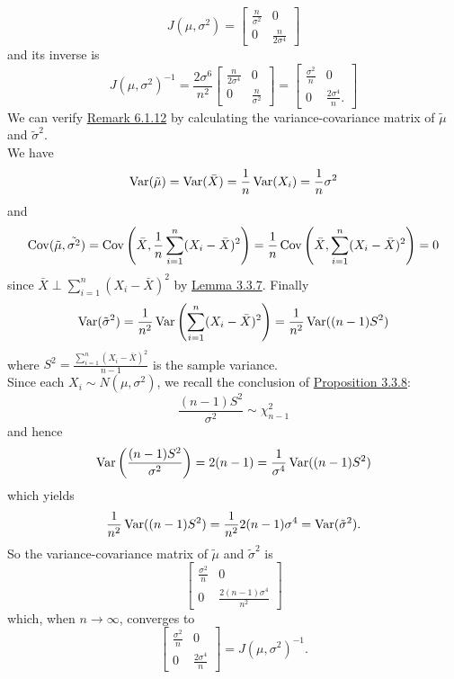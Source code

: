 \documentclass[11pt,fleqn]{book} %
\begin{document}
\begin{example}
\[
J(\mu, \sigma^2) = \begin{bmatrix}
\frac{n}{\sigma^2} & 0 \\
0 & \frac{n}{2\sigma^4}
\end{bmatrix}
\]
and its inverse is
\[
J(\mu, \sigma^2)^{-1} = \frac{2\sigma^6}{n^2}\begin{bmatrix}
\frac{n}{2\sigma^4} & 0 \\
0 & \frac{n}{\sigma^2}
\end{bmatrix} = \begin{bmatrix}
\frac{\sigma^2}{n} & 0 \\
0 & \frac{2\sigma^4}{n}.
\end{bmatrix}
\]
\indent We can verify \hyperref[eg:6112]{Remark 6.1.12} by calculating the variance-covariance matrix of \(\tilde{\mu}\) and \(\tilde{\sigma}^2\). \\
\indent We have
\[
\operatorname{Var}(\tilde{\mu}) = \operatorname{Var}(\bar{X}) = \frac1n\operatorname{Var}(X_i) = \frac1n\sigma^2
\]
and
\[
\operatorname{Cov}(\tilde{\mu}, \tilde{\sigma^2}) = \operatorname{Cov}\left(\bar{X}, \frac1n\sum_{i=1}^n(X_i - \bar{X})^2\right) = \frac1n\operatorname{Cov}\left(\bar{X}, \sum_{i=1}^n(X_i - \bar{X})^2\right) = 0
\]
since \(\bar{X} \perp\sum_{i=1}^n(X_i - \bar{X})^2\) by \hyperref[lemma:337]{Lemma 3.3.7}. Finally
\[
\operatorname{Var}(\tilde{\sigma}^2) = \frac{1}{n^2}\operatorname{Var}\left(\sum_{i=1}^n(X_i - \bar{X})^2\right) = \frac{1}{n^2}\operatorname{Var}((n-1)S^2)
\]
where \(S^2 = \frac{\sum_{i=1}^n(X_i - \bar{X})^2}{n-1}\) is the sample variance. \\
\indent Since each \(X_i \sim N(\mu, \sigma^2)\), we recall the conclusion of \hyperref[prop:338]{Proposition 3.3.8}:
\[
\frac{(n-1)S^2}{\sigma^2} \sim \chi^2_{n-1}
\]
and hence
\[
\operatorname{Var}\left(\frac{(n-1)S^2}{\sigma^2}\right) = 2(n-1) = \frac{1}{\sigma^4}\operatorname{Var}((n-1)S^2)
\]
which yields
\[
\frac{1}{n^2}\operatorname{Var}((n-1)S^2) = \frac{1}{n^2}2(n-1)\sigma^4 = \operatorname{Var}(\tilde{\sigma}^2).
\]
\indent So the variance-covariance matrix of \(\tilde{\mu}\) and \(\tilde{\sigma}^2\) is
\[
\begin{bmatrix}
\frac{\sigma^2}{n} & 0 \\
0 & \frac{2(n-1)\sigma^4}{n^2}
\end{bmatrix}
\]
which, when \(n\rightarrow\infty\), converges to
\[
\begin{bmatrix}
\frac{\sigma^2}{n} & 0 \\
0 & \frac{2\sigma^4}{n}
\end{bmatrix} = J(\mu, \sigma^2)^{-1}.
\]
\end{example}

\end{document}
